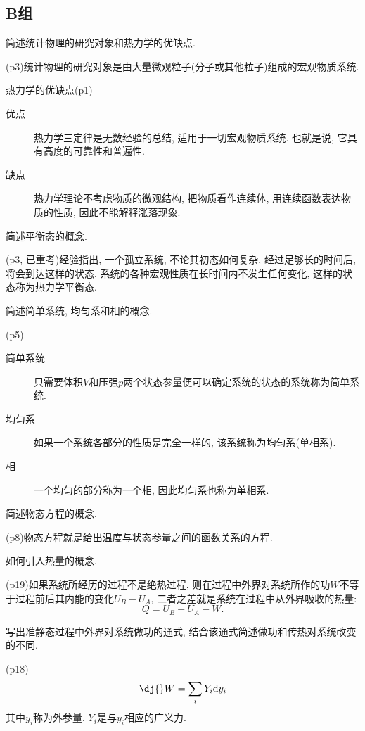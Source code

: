 \subsection{B组}
\begin{questions}
  \question 简述统计物理的研究对象和热力学的优缺点.
  \begin{solution}
    (p3)统计物理的研究对象是由大量微观粒子(分子或其他粒子)组成的宏观物质系统.

    热力学的优缺点(p1)
    \begin{description}
      \item[优点] 热力学三定律是无数经验的总结, 适用于一切宏观物质系统. 也就是说, 它具有高度的可靠性和普遍性.
      \item[缺点] 热力学理论不考虑物质的微观结构, 把物质看作连续体, 用连续函数表达物质的性质, 因此不能解释涨落现象.
    \end{description}
  \end{solution}
  \question 简述平衡态的概念.
  \begin{solution}
    (p3, 已重考)经验指出, 一个孤立系统, 不论其初态如何复杂, 经过足够长的时间后, 将会到达这样的状态, 系统的各种宏观性质在长时间内不发生任何变化, 这样的状态称为热力学平衡态.
  \end{solution}
  \question 简述简单系统, 均匀系和相的概念.
  \begin{solution}
    (p5)
    \begin{description}
      \item[简单系统] 只需要体积$V$和压强$p$两个状态参量便可以确定系统的状态的系统称为简单系统.
      \item[均匀系] 如果一个系统各部分的性质是完全一样的, 该系统称为均匀系(单相系).
      \item[相] 一个均匀的部分称为一个相, 因此均匀系也称为单相系.
    \end{description}
  \end{solution}
  \question 简述物态方程的概念.
  \begin{solution}
    (p8)物态方程就是给出温度与状态参量之间的函数关系的方程.
  \end{solution}
  \question 如何引入热量的概念.
  \begin{solution}
    (p19)如果系统所经历的过程不是绝热过程, 则在过程中外界对系统所作的功$W$不等于过程前后其内能的变化$U_B-U_A$, 二者之差就是系统在过程中从外界吸收的热量:
    \begin{equation}
      Q = U_B - U_A - W.
    \end{equation}
  \end{solution}
  \question 写出准静态过程中外界对系统做功的通式, 结合该通式简述做功和传热对系统改变的不同.
  \begin{solution}
    (p18)
    \begin{equation}
      \dj{} W = \sum_i Y_i \dd y_i
    \end{equation}
    其中$y_i$称为外参量, $Y_i$是与$y_i$相应的广义力.
  \end{solution}
\end{questions}
